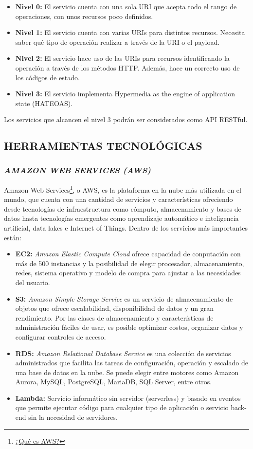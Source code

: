 \begin{itemize}
    \item \textbf{Nivel 0:} El servicio cuenta con una sola URI que acepta todo el rango de operaciones, con unos recursos poco definidos.
    \item \textbf{Nivel 1:} El servicio cuenta con varias URIs para distintos recursos. Necesita saber qué tipo de operación realizar a través de la URI o el payload.
    \item \textbf{Nivel 2:} El servicio hace uso de las URIs para recursos identificando la operación a través de los métodos HTTP. Además, hace un correcto uso de los códigos de estado.
    \item \textbf{Nivel 3:} El servicio implementa Hypermedia as the engine of application state (HATEOAS).
\end{itemize}
Los servicios que alcancen el nivel 3 podrán ser considerados como API RESTful.

\subsection{HERRAMIENTAS TECNOLÓGICAS}

\subsubsection*{\textit{AMAZON WEB SERVICES (AWS)} }

Amazon Web Services\footnote{\href{https://aws.amazon.com/es/what-is-aws/}{¿Qué es AWS?}}, o AWS, es la plataforma en la nube más utilizada en el mundo, que cuenta con una cantidad de servicios y características ofreciendo desde tecnologías de infraestructura como cómputo, almacenamiento y bases de datos hasta tecnologías emergentes como aprendizaje automático e inteligencia artificial, data lakes e Internet of Things. Dentro de los servicios más importantes están:
\begin{itemize}
    \item \textbf{EC2:} \textit{Amazon Elastic Compute Cloud} ofrece capacidad de conputación con más de 500 instancias y la posibilidad de elegir procesador, almacenamiento, redes, sistema operativo y modelo de compra para ajustar a las necesidades del usuario.
    \item \textbf{S3:} \textit{Amazon Simple Storage Service} es un servicio de almacenamiento de objetos que ofrece escalabilidad, disponibilidad de datos y un gran rendimiento. Por las clases de almacenamiento y características de administración fáciles de usar, es posible optimizar costos, organizar datos y configurar controles de acceso.
    \item \textbf{RDS:} \textit{Amazon Relational Database Service} es una colección de servicios administrados que facilita las tareas de configuración, operación y escalado de una base de datos en la nube. Se puede elegir entre motores como Amazon Aurora, MySQL, PostgreSQL, MariaDB, SQL Server, entre otros.
    \item \textbf{Lambda:} Servicio informático sin servidor (serverless) y basado en eventos que permite ejecutar código para cualquier tipo de aplicación o servicio back-end sin la necesidad de servidores.
\end{itemize}

